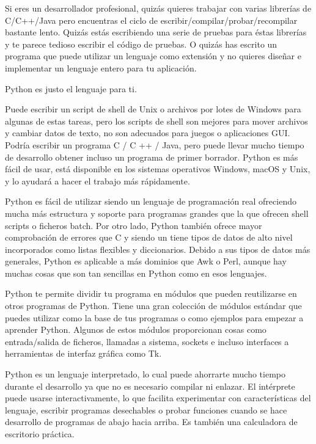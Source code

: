 \documentclass[a5paper,10pt,spanish]{sphinxmanual}
\begin{document}
\sphinxAtStartPar
Si eres un desarrollador profesional, quizás quieres trabajar con varias librerías de C/C++/Java pero encuentras el ciclo de escribir/compilar/probar/recompilar bastante lento. Quizás estás escribiendo una serie de pruebas para éstas librerías y te parece tedioso escribir el código de pruebas. O quizás has escrito un programa que puede utilizar un lenguaje como extensión y no quieres diseñar e implementar un lenguaje entero para tu aplicación.

\sphinxAtStartPar
Python es justo el lenguaje para ti.

\sphinxAtStartPar
Puede escribir un script de shell de Unix o archivos por lotes de Windows para algunas de estas tareas, pero los scripts de shell son mejores para mover archivos y cambiar datos de texto, no son adecuados para juegos o aplicaciones GUI. Podría escribir un programa C / C ++ / Java, pero puede llevar mucho tiempo de desarrollo obtener incluso un programa de primer borrador. Python es más fácil de usar, está disponible en los sistemas operativos Windows, macOS y Unix, y lo ayudará a hacer el trabajo más rápidamente.

\sphinxAtStartPar
Python es fácil de utilizar siendo un lenguaje de programación real ofreciendo mucha más estructura y soporte para programas grandes que la que ofrecen shell scripts o ficheros batch. Por otro lado, Python también ofrece mayor comprobación de errores que C y siendo un  tiene tipos de datos de alto nivel incorporados como listas flexibles y diccionarios. Debido a sus tipos de datos más generales, Python es aplicable a más dominios que Awk o Perl, aunque hay muchas cosas que son tan sencillas en Python como en esos lenguajes.

\sphinxAtStartPar
Python te permite dividir tu programa en módulos que pueden reutilizarse en otros programas de Python. Tiene una gran colección de módulos estándar que puedes utilizar como la base de tus programas o como ejemplos para empezar a aprender Python. Algunos de estos módulos proporcionan cosas como entrada/salida de ficheros, llamadas a sistema, sockets e incluso interfaces a herramientas de interfaz gráfica como Tk.

\sphinxAtStartPar
Python es un lenguaje interpretado, lo cual puede ahorrarte mucho tiempo durante el desarrollo ya que no es necesario compilar ni enlazar. El intérprete puede usarse interactivamente, lo que facilita experimentar con características del lenguaje, escribir programas desechables o probar funciones cuando se hace desarrollo de programas de abajo hacia arriba. Es también una calculadora de escritorio práctica.
\end{document}

